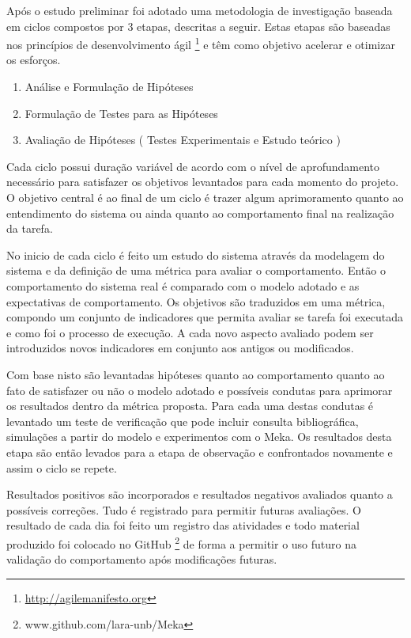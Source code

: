 Após o estudo preliminar foi adotado uma metodologia de investigação baseada em ciclos compostos por 3 etapas, descritas a seguir. Estas etapas são baseadas nos princípios de desenvolvimento ágil \footnote{\url{http://agilemanifesto.org}} e têm como objetivo acelerar e otimizar os esforços.


\begin{enumerate}
    \item Análise e Formulação de Hipóteses
    \item Formulação de Testes para as Hipóteses
    \item Avaliação de Hipóteses ( Testes Experimentais e Estudo teórico )
\end{enumerate}

Cada ciclo possui duração variável de acordo com o nível de aprofundamento necessário para satisfazer os objetivos levantados para cada momento do projeto. O objetivo central é ao final de um ciclo é trazer algum aprimoramento quanto ao entendimento do sistema ou ainda quanto ao comportamento final na realização da tarefa.

No inicio de cada ciclo é feito um estudo do sistema através da modelagem do sistema e da definição de uma métrica para avaliar o comportamento. Então o comportamento do sistema real é comparado com o modelo adotado e as expectativas de comportamento. Os objetivos são traduzidos em uma métrica, compondo um conjunto de indicadores que permita avaliar se tarefa foi executada e como foi o processo de execução. A cada novo aspecto avaliado podem ser introduzidos novos indicadores em conjunto aos antigos ou modificados. 

Com base nisto são levantadas hipóteses quanto ao comportamento quanto ao fato de satisfazer ou não o modelo adotado e possíveis condutas para aprimorar os resultados dentro da métrica proposta. Para cada uma destas condutas é levantado um teste de verificação que pode incluir consulta bibliográfica, simulações a partir do modelo e experimentos com o Meka. Os resultados desta etapa são então levados para a etapa de observação e confrontados novamente e assim o ciclo se repete.

Resultados positivos são incorporados e resultados negativos avaliados quanto a possíveis correções. Tudo é registrado para permitir futuras avaliações. O resultado de cada dia foi feito um registro das atividades e todo material produzido foi colocado no GitHub \footnote{www.github.com/lara-unb/Meka} de forma a permitir o uso futuro na validação do comportamento após modificações futuras.

